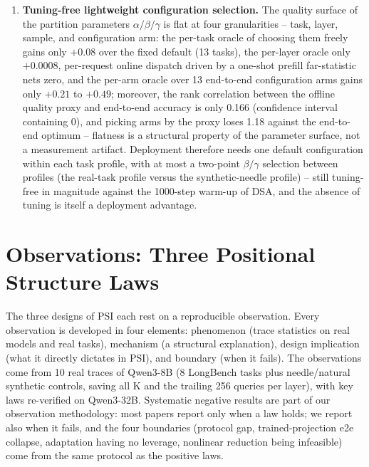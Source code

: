 \documentclass[11pt]{article}
\begin{document}
\begin{enumerate}
\item \textbf{Tuning-free lightweight configuration selection.} The quality surface of the partition parameters $\alpha/\beta/\gamma$ is flat at four granularities -- task, layer, sample, and configuration arm: the per-task oracle of choosing them freely gains only $+0.08$ over the fixed default (13 tasks), the per-layer oracle only $+0.0008$, per-request online dispatch driven by a one-shot prefill far-statistic nets zero, and the per-arm oracle over 13 end-to-end configuration arms gains only $+0.21$ to $+0.49$; moreover, the rank correlation between the offline quality proxy and end-to-end accuracy is only 0.166 (confidence interval containing 0), and picking arms by the proxy loses 1.18 against the end-to-end optimum -- flatness is a structural property of the parameter surface, not a measurement artifact. Deployment therefore needs one default configuration within each task profile, with at most a two-point $\beta/\gamma$ selection between profiles (the real-task profile versus the synthetic-needle profile) -- still tuning-free in magnitude against the 1000-step warm-up of DSA, and the absence of tuning is itself a deployment advantage.
\end{enumerate}

\section{Observations: Three Positional Structure Laws}\label{sec:obs}

The three designs of PSI each rest on a reproducible observation. Every observation is developed in four elements: phenomenon (trace statistics on real models and real tasks), mechanism (a structural explanation), design implication (what it directly dictates in PSI), and boundary (when it fails). The observations come from 10 real traces of Qwen3-8B (8 LongBench tasks plus needle/natural synthetic controls, saving all K and the trailing 256 queries per layer), with key laws re-verified on Qwen3-32B. Systematic negative results are part of our observation methodology: most papers report only when a law holds; we report also when it fails, and the four boundaries (protocol gap, trained-projection e2e collapse, adaptation having no leverage, nonlinear reduction being infeasible) come from the same protocol as the positive laws.
\end{document}
